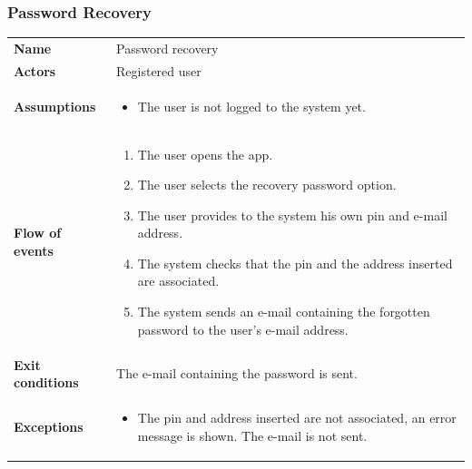 \documentclass[english]{article}
\begin{document}
		\subsubsection{Password Recovery}
		\begin{center}
		\begin{tabular}{l||p{10cm}}
		\textbf{Name} 
			& Password recovery\\ [8px]
		\textbf{Actors} 
			& Registered user\\ [8px]
		\textbf{Assumptions} 
			& \begin{itemize}
				\item The user is not logged to the system yet.
			\end{itemize}\\
		\textbf{Flow of events}
			& \begin{enumerate}
	 			\item The user opens the app.
				\item The user selects the recovery password option.
				\item The user provides to the system his own pin and e-mail address.
				\item The system checks that the pin and the address inserted are associated.
				\item The system sends an e-mail containing the forgotten password to the user's e-mail address.
			\end{enumerate}\\ 
		\textbf{Exit conditions}
			& The e-mail containing the password is sent.\\ [8px]
		\textbf{Exceptions}
			& \begin{itemize}
				\item The pin and address inserted are not associated, an error message is shown. The e-mail is not sent.
			\end{itemize}
		\end{tabular}
		\end{center}
		\noindent
\end{document}
